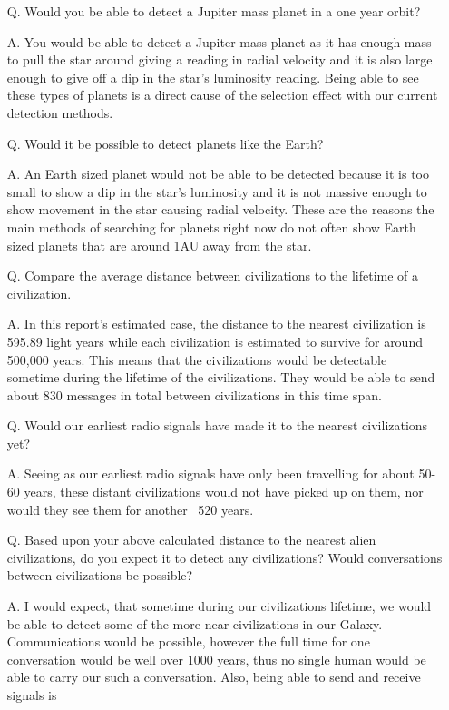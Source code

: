 \documentclass{article}
\begin{document}
\begin{enumerate}
\item[Q.] Would you be able to detect a Jupiter mass planet in a one year orbit?
\item[A.] You would be able to detect a Jupiter mass planet as it has enough mass to pull the star around giving a reading in 
radial velocity and it is also large enough to give off a dip in the star's luminosity reading. Being able to see these types of
planets is a direct cause of the selection effect with our current detection methods.
\item[Q.] Would it be possible to detect planets like the Earth?
\item[A.] An Earth sized planet would not be able to be detected because it is too small to show a dip in the star's luminosity
and it is not massive enough to show movement in the star causing radial velocity. These are the reasons the main methods
of searching for planets right now do not often show Earth sized planets that are around 1AU away from the star.
\item[Q.] Compare the average distance between civilizations to the lifetime of a civilization.
\item[A.] In this report's estimated case, the distance to the nearest civilization is 595.89 light years while each civilization is
estimated to survive for around 500,000 years. This means that the civilizations would be detectable sometime during
the lifetime of the civilizations. They would be able to send about 830 messages in total between civilizations in this
time span.
\item[Q.] Would our earliest radio signals have made it to the nearest civilizations yet?
\item[A.] Seeing as our earliest radio signals have only been travelling for about 50-60 years, these distant civilizations would
not have picked up on them, nor would they see them for another ~520 years.
\item[Q.] Based upon your above calculated distance to the nearest alien civilizations, do you expect it to detect any civilizations?
Would conversations between civilizations be possible?
\item[A.] I would expect, that sometime during our civilizations lifetime, we would be able to detect some of the more near
civilizations in our Galaxy. Communications would be possible, however the full time for one conversation would be well over 
1000 years, thus no single human would be able to carry our such a conversation. Also, being able to send and receive signals is

\end{enumerate}
\end{document}
